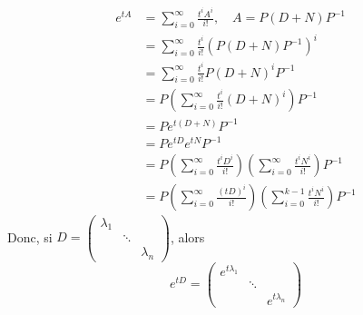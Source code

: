 \documentclass[../main.tex]{subfiles}
\begin{document}
\begin{align*}
	e^{tA} &= \sum_{i=0}^{ \infty } \frac{t^{i}A^{i}}{i!}, \quad A = P( D+N) P^{-1}\\
	       &= \sum_{i=0}^{ \infty } \frac{t^{i}}{i!} ( P ( D+N) P^{-1}) ^{i}\\
	       &= \sum_{i=0}^{ \infty } \frac{t^{i}}{i!}P ( D+N) ^{i}P^{-1}\\
	       &= P ( \sum_{i=0}^{ \infty } \frac{t^{i}}{i!} ( D+N) ^{i}) P^{-1}\\
	       &= P e^{t( D+N) } P^{-1}\\
	       &= P e^{tD} e^{tN} P^{-1}\\
	       &= P ( \sum_{i=0}^{ \infty } \frac{t^{i}D^{i}}{i!}) ( \sum_{i=0}^{ \infty } \frac{t^{i}N^{i}}{i!}) P^{-1}\\
	       &= P ( \sum_{i=0}^{ \infty }\frac{( tD) ^{i}}{i!}) ( \sum_{i=0}^{ k-1} \frac{t^{i}N^{i}}{i!}) P^{-1}	
\end{align*}
Donc, si $D = \begin{pmatrix}
	\lambda_1 & & \\
		  & \ddots &\\
		  & & \lambda_n
\end{pmatrix} $, alors
\[ 
e^{tD} = \begin{pmatrix}
	e^{t\lambda_1}  & &\\
		       & \ddots &\\
		       & & e^{t \lambda_n} 
\end{pmatrix} 
\]
\end{document}
